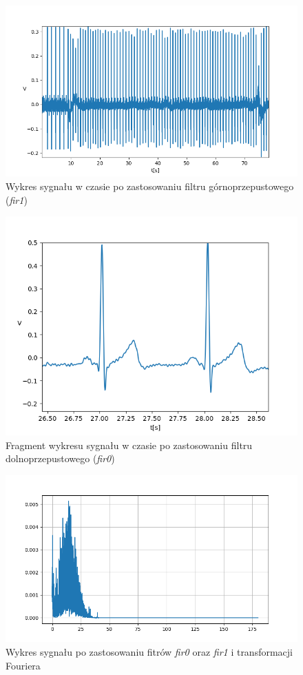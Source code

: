 \begin{figure}[h!]
    \centering 
    \includegraphics[scale=0.5]{pl/media/hpsig.png}
    \caption{Wykres sygnału w czasie po zastosowaniu filtru górnoprzepustowego (\textit{fir1})} 
    \label{fig:hpsig}
\end{figure}

\begin{figure}[h!]
    \centering 
    \includegraphics[scale=0.5]{pl/media/lpsig.png}
    \caption{Fragment wykresu sygnału w czasie po zastosowaniu 
    filtru dolnoprzepustowego (\textit{fir0})} 
    \label{fig:lpsig}
\end{figure}


\begin{figure}[h!]
    \centering 
    \includegraphics[scale=0.5]{pl/media/fftall.png}
    \caption{Wykres sygnału po zastosowaniu fitrów \textit{fir0} oraz \textit{fir1} 
    i transformacji Fouriera} 
    \label{fig:filtfft}
\end{figure}

